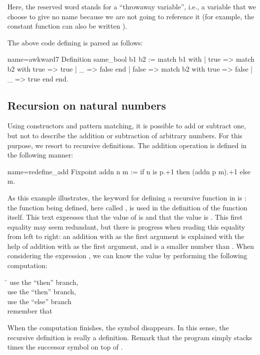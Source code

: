 Here, the reserved word \C{_} stands for a ``throwaway variable'', i.e.,
a variable that we choose to give no name because we are not going to
reference it (for example, the constant function
 can also be written
).
\index[coq]{\C{_}}

The above code defining  is parsed as follows:

\begin{coq}{name=awkward7}{}
Definition same_bool b1 b2 :=
  match b1 with
  | true => match b2 with true => true | _ => false end
  | false => match b2 with true => false | _ => true end
  end.
\end{coq}


\subsection{Recursion on natural numbers}\label{ssec:recnat}


Using constructors and pattern matching, it is possible to add or
subtract one, but not to describe the addition or subtraction of
arbitrary numbers. For this purpose, we resort to recursive
definitions. The addition operation is defined in the
following manner:

\begin{coq}{name=redefine_add}{}
Fixpoint addn n m :=
  if n is p.+1 then (addn p m).+1 else m.
\end{coq}
As this example illustrates, the keyword for defining a recursive
function in \Coq{} is : the function being
defined, here called , is used in the definition of the
function  itself.  This text expresses that the value of
 is
 and that the value  is .
This first equality may
seem redundant, but there is progress when reading this equality from
left to right: an addition with  as the first argument
is explained with the help of addition with  as the first
argument, and  is a smaller number than .  When considering the
expression , we can know the value by performing the following
computation:
\begin{tabbing}
\=\kill
{} \> use the ``then'' branch, \\
 \> use the ``then'' branch, \\
 \> use the ``else'' branch\\
\> remember that 
\end{tabbing}
When the computation finishes, the symbol  disappears.  In
this sense, the recursive definition is really a definition.  Remark that
the  program simply stacks  times the successor symbol
on top of .

